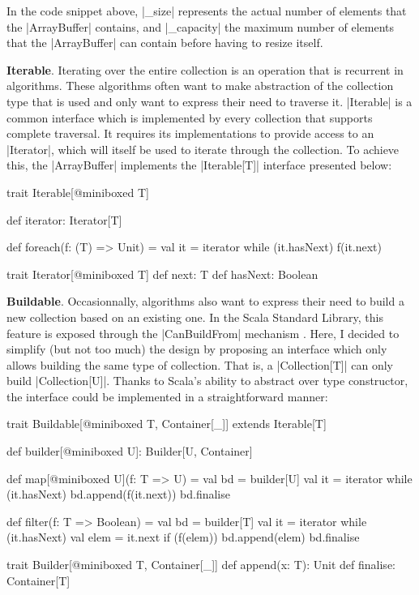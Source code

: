 In the code snippet above, |_size| represents the actual number of elements that the |ArrayBuffer| contains, and |_capacity| the maximum number of elements that the |ArrayBuffer| can contain before having to resize itself.
 
\textbf{Iterable}. Iterating over the entire collection is an operation that is recurrent in algorithms. These algorithms often want to make abstraction of the collection type that is used and only want to express their need to traverse it. |Iterable| is a common interface which is implemented by every collection that supports complete traversal. It requires its implementations to provide access to an |Iterator|, which will itself be used to iterate through the collection. To achieve this, the |ArrayBuffer| implements the |Iterable[T]| interface presented below:

\begin{lstlisting-nobreak}
trait Iterable[@miniboxed T] {
  def iterator: Iterator[T]

  def foreach(f: (T) => Unit) = {
    val it = iterator
    while (it.hasNext) {
      f(it.next)
    }
  }
}

trait Iterator[@miniboxed T] {
  def next: T
  def hasNext: Boolean
}
\end{lstlisting-nobreak}

\textbf{Buildable}. Occasionnally, algorithms also want to express their need to build a new collection based on an existing one. In the Scala Standard Library, this feature is exposed through the |CanBuildFrom| mechanism \cite{adriaan-moors-thesis}. 
Here, I decided to simplify (but not too much) the design by proposing an interface which only allows building the same type of collection. That is, a |Collection[T]| can only build |Collection[U]|. Thanks to Scala's ability to abstract over type constructor, the interface could be implemented in a straightforward manner: 

\begin{lstlisting-nobreak}
trait Buildable[@miniboxed T, Container[_]] extends Iterable[T] {
  def builder[@miniboxed U]: Builder[U, Container]

  def map[@miniboxed U](f: T => U) = {
    val bd = builder[U]
    val it = iterator
    while (it.hasNext) {
      bd.append(f(it.next))
    }
    bd.finalise
  }

  def filter(f: T => Boolean) = {
    val bd = builder[T]
    val it = iterator
    while (it.hasNext) {
      val elem = it.next
      if (f(elem)) {
        bd.append(elem)
      }
    }
    bd.finalise
  }
}

trait Builder[@miniboxed T, Container[_]] {
  def append(x: T): Unit
  def finalise: Container[T]
}
\end{lstlisting-nobreak}


